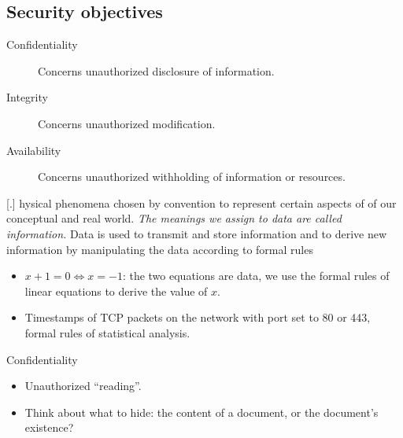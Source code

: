 \subsection{Security objectives}

\begin{frame}
  \begin{description}
    \item[Confidentiality] Concerns unauthorized disclosure of information.
    \item[Integrity] Concerns unauthorized modification.
    \item[Availability] Concerns unauthorized withholding of information or 
      resources.
  \end{description}
\end{frame}

\begin{frame}
  \begin{definition}
    [.]{%
       hysical phenomena chosen by convention 
      to represent certain aspects of of our conceptual and real world.
      \emph{The meanings we assign to data are called information.} 
      Data is used to transmit and store information and to derive new 
      information by manipulating the data according to formal rules%
    }
  \end{definition}
\end{frame}

\begin{frame}
  \begin{example}
    \begin{itemize}
      \item \(x + 1 = 0\iff x = -1\): the two equations are data, we use the 
        formal rules of linear equations to derive the value of \(x\).
    \end{itemize}
  \end{example}

  \begin{example}
    \begin{itemize}
      \item Timestamps of TCP packets on the network with port set to 80 or 443, 
        formal rules of statistical analysis.
    \end{itemize}
  \end{example}
\end{frame}

\begin{frame}
  \begin{block}{Confidentiality}
    \begin{itemize}
      \item Unauthorized \enquote{reading}.

      \item Think about what to hide: the content of a document, or the 
        document's existence?
    \end{itemize}
  \end{block}
\end{frame}

